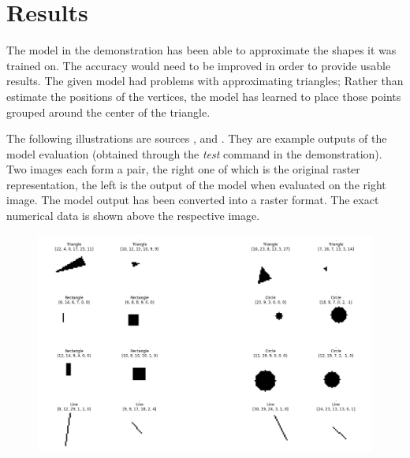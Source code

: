 \documentclass[12pt, a4paper, titlepage]{report}
\begin{document}



\chapter{Results}

The model in the demonstration has been able to approximate the shapes it was trained on. The accuracy would need to be improved in order to provide usable results. The given model had problems with approximating triangles; Rather than estimate the positions of the vertices, the model has learned to place those points grouped around the center of the triangle.

The following illustrations are sources \cite{results_demonstration1}, \cite{results_demonstration2} and \cite{results_demonstration3} . They are example outputs of the model evaluation (obtained through the \emph{test} command in the demonstration). Two images each form a pair, the right one of which is the original raster representation, the left is the output of the model when evaluated on the right image. The model output has been converted into a raster format. The exact numerical data is shown above the respective image.

\begin{figure}[h]
   \includegraphics[width=1.0\textwidth]{../rc/images/all_shapes_approx_visual1.png}
   \label{fig:results_demonstration1}
\end{figure}
\end{document}
